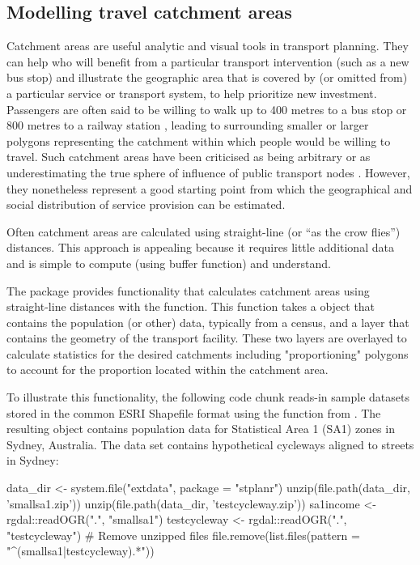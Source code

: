 \subsection{Modelling travel catchment
areas}\label{modelling-travel-catchment-areas}

Catchment areas are useful analytic and visual tools in transport planning.
They can help who will benefit from a particular
transport intervention (such as a new bus stop) and
illustrate the geographic area that is covered by (or omitted from) a particular service
or transport system, to help prioritize new investment.
Passengers are often said to be willing to walk
up to 400 metres to a bus stop or 800 metres to a railway station
\citep{el-geneidy_new_2014}, leading to surrounding smaller or larger polygons representing the catchment within which people would be willing to travel.
Such catchment areas have been criticised as being arbitrary or as underestimating the true
sphere of influence of public transport nodes
\citep{el-geneidy_new_2014,daniels_explaining_2013}.
However, they nonetheless
represent a good starting point from
which the geographical and social distribution of service provision can be estimated.

Often catchment areas are calculated using
straight-line (or ``as the crow flies'') distances. This
approach is appealing because it requires little
additional data and is simple to compute (using buffer function) and understand.

The  package provides functionality that calculates catchment areas using
straight-line distances with the  function. This
function takes a  object that contains the
population (or other) data, typically from a census, and a
 layer that contains the geometry of the transport
facility. These two layers are overlayed to calculate statistics for the
desired catchments including "proportioning" polygons to account for the
proportion located within the catchment area.

To illustrate this functionality, the following code chunk
reads-in sample datasets stored in the common ESRI Shapefile format
using the  function from .
The resulting object  contains population data for Statistical Area 1
(SA1) zones in Sydney, Australia. The
 data set contains hypothetical
cycleways aligned to streets in Sydney:

\begin{Schunk}
\begin{Sinput}
data_dir <- system.file("extdata", package = "stplanr")
unzip(file.path(data_dir, 'smallsa1.zip'))
unzip(file.path(data_dir, 'testcycleway.zip'))
sa1income <- rgdal::readOGR(".", "smallsa1")
testcycleway <- rgdal::readOGR(".", "testcycleway")
# Remove unzipped files
file.remove(list.files(pattern = "^(smallsa1|testcycleway).*"))
\end{Sinput}
\end{Schunk}

